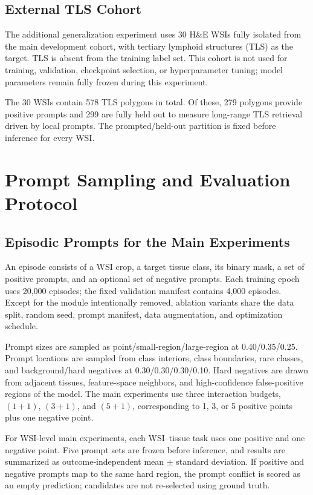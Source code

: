 \documentclass[11pt,letterpaper]{article}
\begin{document}
\subsection{External TLS Cohort}
The additional generalization experiment uses 30 H\&E WSIs fully isolated from the main development cohort, with tertiary lymphoid structures (TLS) as the target. TLS is absent from the training label set. This cohort is not used for training, validation, checkpoint selection, or hyperparameter tuning; model parameters remain fully frozen during this experiment.

The 30 WSIs contain 578 TLS polygons in total. Of these, 279 polygons provide positive prompts and 299 are fully held out to measure long-range TLS retrieval driven by local prompts. The prompted/held-out partition is fixed before inference for every WSI.

\section{Prompt Sampling and Evaluation Protocol}
\subsection{Episodic Prompts for the Main Experiments}
An episode consists of a WSI crop, a target tissue class, its binary mask, a set of positive prompts, and an optional set of negative prompts. Each training epoch uses 20,000 episodes; the fixed validation manifest contains 4,000 episodes. Except for the module intentionally removed, ablation variants share the data split, random seed, prompt manifest, data augmentation, and optimization schedule.

Prompt sizes are sampled as point/small-region/large-region at 0.40/0.35/0.25. Prompt locations are sampled from class interiors, class boundaries, rare classes, and background/hard negatives at 0.30/0.30/0.30/0.10. Hard negatives are drawn from adjacent tissues, feature-space neighbors, and high-confidence false-positive regions of the model. The main experiments use three interaction budgets, $(1+1)$, $(3+1)$, and $(5+1)$, corresponding to 1, 3, or 5 positive points plus one negative point.

For WSI-level main experiments, each WSI--tissue task uses one positive and one negative point. Five prompt sets are frozen before inference, and results are summarized as outcome-independent mean $\pm$ standard deviation. If positive and negative prompts map to the same hard region, the prompt conflict is scored as an empty prediction; candidates are not re-selected using ground truth.
\end{document}
